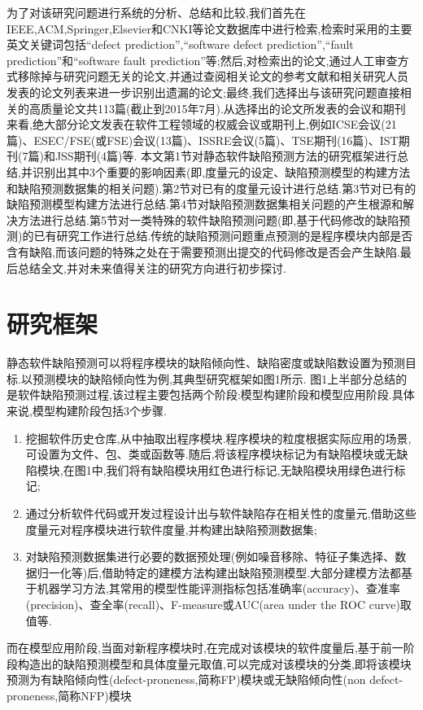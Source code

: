 \documentclass{rjthesis}
\begin{document}
	为了对该研究问题进行系统的分析、总结和比较,我们首先在IEEE,ACM,Springer,Elsevier和CNKI等论文数据库中进行检索,检索时采用的主要英文关键词包括“defect prediction”,“software defect prediction”,“fault prediction”和“software fault prediction”等;然后,对检索出的论文,通过人工审查方式移除掉与研究问题无关的论文,并通过查阅相关论文的参考文献和相关研究人员发表的论文列表来进一步识别出遗漏的论文;最终,我们选择出与该研究问题直接相关的高质量论文共113篇(截止到2015年7月).从选择出的论文所发表的会议和期刊来看,绝大部分论文发表在软件工程领域的权威会议或期刊上,例如ICSE会议(21篇)、ESEC/FSE(或FSE)会议(13篇)、ISSRE会议(5篇)、TSE期刊(16篇)、IST期刊(7篇)和JSS期刊(4篇)等.
	本文第1节对静态软件缺陷预测方法的研究框架进行总结,并识别出其中3个重要的影响因素(即,度量元的设定、缺陷预测模型的构建方法和缺陷预测数据集的相关问题).第2节对已有的度量元设计进行总结.第3节对已有的缺陷预测模型构建方法进行总结.第4节对缺陷预测数据集相关问题的产生根源和解决方法进行总结.第5节对一类特殊的软件缺陷预测问题(即,基于代码修改的缺陷预测)的已有研究工作进行总结.传统的缺陷预测问题重点预测的是程序模块内部是否含有缺陷,而该问题的特殊之处在于需要预测出提交的代码修改是否会产生缺陷.最后总结全文,并对未来值得关注的研究方向进行初步探讨.
	
	\section{研究框架}
	静态软件缺陷预测可以将程序模块的缺陷倾向性、缺陷密度或缺陷数设置为预测目标.以预测模块的缺陷倾向性为例,其典型研究框架如图1所示.
	图1上半部分总结的是软件缺陷预测过程,该过程主要包括两个阶段:模型构建阶段和模型应用阶段.具体来说,模型构建阶段包括3个步骤.
	\begin{enumerate}
		\item 挖掘软件历史仓库,从中抽取出程序模块.程序模块的粒度根据实际应用的场景,可设置为文件、包、类或函数等.随后,将该程序模块标记为有缺陷模块或无缺陷模块,在图1中,我们将有缺陷模块用红色进行标记,无缺陷模块用绿色进行标记;
		\item 通过分析软件代码或开发过程设计出与软件缺陷存在相关性的度量元,借助这些度量元对程序模块进行软件度量,并构建出缺陷预测数据集;
		\item 对缺陷预测数据集进行必要的数据预处理(例如噪音移除、特征子集选择、数据归一化等)后,借助特定的建模方法构建出缺陷预测模型.大部分建模方法都基于机器学习方法,其常用的模型性能评测指标包括准确率(accuracy)、查准率(precision)、查全率(recall)、F-measure或AUC(area under the ROC curve)取值等.
	\end{enumerate}

	而在模型应用阶段,当面对新程序模块时,在完成对该模块的软件度量后,基于前一阶段构造出的缺陷预测模型和具体度量元取值,可以完成对该模块的分类,即将该模块预测为有缺陷倾向性(defect-proneness,简称FP)模块或无缺陷倾向性(non defect-proneness,简称NFP)模块
	
\end{document}

